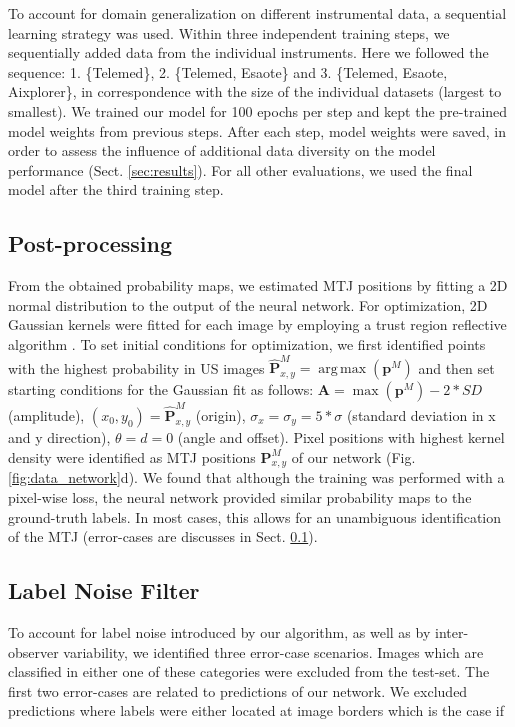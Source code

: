 \documentclass[journal,twoside,web]{ieeecolor}
\DeclareMathOperator*{\argmax}{arg\,max}
\begin{document}
To account for domain generalization on different instrumental data, a sequential learning strategy was used. Within three independent training steps, we sequentially added data from the individual instruments. Here we followed the sequence: 1. \{Telemed\}, 2. \{Telemed, Esaote\} and 3. \{Telemed, Esaote, Aixplorer\}, in correspondence with the size of the individual datasets (largest to smallest). We trained our model for 100 epochs per step and kept the pre-trained model weights from previous steps. After each step, model weights were saved, in order to assess the influence of additional data diversity on the model performance (Sect. \ref{sec:results}). For all other evaluations, we used the final model after the third training step.


\subsection*{Post-processing}
\label{sec:methods.post}

From the obtained probability maps, we estimated MTJ positions by fitting a 2D normal distribution to the output of the neural network. For optimization, 2D Gaussian kernels were fitted for each image by employing a trust region reflective algorithm \cite{j:Branch1999}. To set initial conditions for optimization, we first identified points with the highest probability in US images $\hat{\boldsymbol{P}}^{M}_{x,y} = \argmax(\boldsymbol{p}^{M})$ and then set starting conditions for the Gaussian fit as follows: $\boldsymbol{A} = \max(\boldsymbol{p}^{M})-2*SD$ (amplitude), $(x_0,y_0) = \hat{\boldsymbol{P}}^{M}_{x,y}$ (origin), $\sigma_x = \sigma_y = 5 * \sigma$ (standard deviation in x and y direction), $\theta = d = 0$ (angle and offset). Pixel positions with highest kernel density were identified as MTJ positions $\boldsymbol{P}^{M}_{x,y}$ of our network (Fig. \ref{fig:data_network}d). We found that although the training was performed with a pixel-wise loss, the neural network provided similar probability maps to the ground-truth labels. In most cases, this allows for an unambiguous identification of the MTJ (error-cases are discusses in Sect. \ref{sec:errorcases}). 


\subsection{Label Noise Filter}
\label{sec:errorcases}
To account for label noise introduced by our algorithm, as well as by inter-observer variability, we identified three error-case scenarios. Images which are classified in either one of these categories were excluded from the test-set. The first two error-cases are related to predictions of our network. We excluded predictions where labels were either located at image borders which is the case if 
\end{document}
